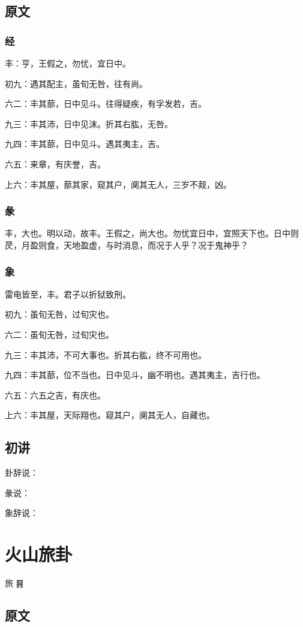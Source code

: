 \documentclass[12pt,oneside]{book}
\begin{document}
\section{原文}

\subsection{经}
丰：亨，王假之，勿忧，宜日中。

初九：遇其配主，虽旬无咎，往有尚。

六二：丰其蔀，日中见斗。往得疑疾，有孚发若，吉。

九三：丰其沛，日中见沫。折其右肱，无咎。

九四：丰其蔀，日中见斗。遇其夷主，吉。

六五：来章，有庆誉，吉。

上六：丰其屋，蔀其家，窥其户，阒其无人，三岁不觌，凶。

\subsection{彖}
丰，大也。明以动，故丰。王假之，尚大也。勿忧宜日中，宜照天下也。日中则昃，月盈则食，天地盈虚，与时消息，而况于人乎？况于鬼神乎？

\subsection{象}
雷电皆至，丰。君子以折狱致刑。

初九：虽旬无咎，过旬灾也。

六二：虽旬无咎，过旬灾也。

九三：丰其沛，不可大事也。折其右肱，终不可用也。

九四：丰其蔀，位不当也。日中见斗，幽不明也。遇其夷主，吉行也。

六五：六五之吉，有庆也。

上六：丰其屋，天际翔也。窥其户，阒其无人，自藏也。

\section{初讲}
卦辞说：

彖说：

象辞说：

\chapter{火山旅卦}
旅 {\Large ䷷}


\section{原文}
\end{document}
